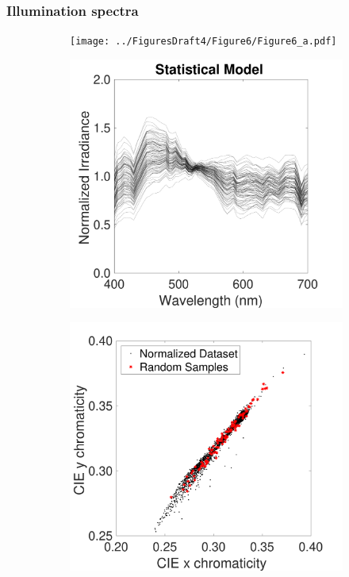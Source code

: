 \documentclass{jov}
\begin{document}
\subsubsection{Illumination spectra}
\begin{figure}
\centering
    \begin{subfigure}[b]{0.24 \textwidth}
    \centering
	\caption{}
        \texttt{[image: ../FiguresDraft4/Figure6/Figure6\_a.pdf]}
        \label{fig:granadaData}
    \end{subfigure}
	\begin{subfigure}[b]{0.24 \textwidth}
    \centering
        \caption{}
        \includegraphics[width=\textwidth]{../FiguresDraft4/Figure6/Figure6_b.pdf}
        \label{fig:illuminantSamples}
    \end{subfigure}
      	\begin{subfigure}[b]{0.24 \textwidth}
    \centering
        \caption{}
        \includegraphics[width=\textwidth]{../FiguresDraft4/Figure6/Figure6_c.pdf}

\end{subfigure}
\end{figure}
\end{document}
